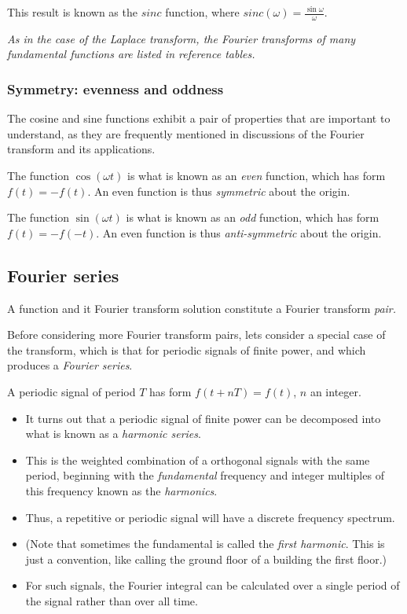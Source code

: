 \documentclass[11pt]{report}
\begin{document}
This result is known as the $sinc$ function, where $sinc(\omega) =  \frac{\sin\omega}{\omega}$.

\textit{As in the case of the Laplace transform, the Fourier
transforms of many fundamental functions are listed in reference tables.}

\subsubsection*{Symmetry: evenness and oddness}

The cosine and sine functions exhibit a pair of properties that are
important to understand, as they are frequently mentioned in
discussions of the Fourier transform and its applications.

The function $\cos(\omega t)$ is what is known as an \textit{even}
function, which has form $f(t) = -f(t)$. An even function is thus
\textit{symmetric} about the origin.

The function $\sin(\omega t)$ is what is known as an \textit{odd}
function, which has form $f(t) = -f(-t)$. An even function is thus
\textit{anti-symmetric} about the origin.

\subsection*{Fourier series}

A function and it Fourier transform solution constitute a Fourier
transform \textit{pair.}

Before considering more Fourier transform pairs, lets consider a
special case of the transform, which is that for periodic signals of
finite power, and which produces a \textit{Fourier series}.

A periodic signal of period $T$ has form $f(t+nT) = f(t)$, $n$ an integer.  

\begin{itemize}
\item It turns out that a periodic signal of finite power can be decomposed
into what is known as a \textit{harmonic series}.
\item This is the weighted
combination of a orthogonal signals with the same period, beginning
with the \textit{fundamental} frequency and integer multiples of this frequency
known as the \textit{harmonics}.

\item Thus, a repetitive or periodic signal will have a discrete frequency
spectrum.

\item (Note that sometimes the fundamental is called the \textit{first harmonic}.
This is just a convention, like calling the ground floor of a building
the first floor.)

\item For such signals, the Fourier integral can be calculated over a single
period of the signal rather than over all time.

\end{itemize}
\end{document}
